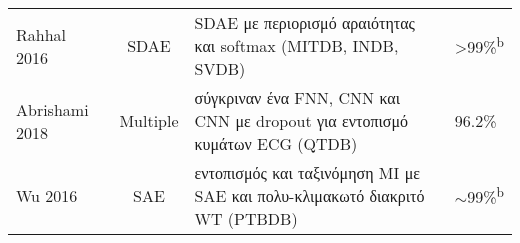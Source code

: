 \begin{sidewaystable}
\begin{tabular}{l c l l}
		Rahhal 2016~\cite{al2016deep}          & SDAE            & SDAE με περιορισμό αραιότητας και softmax (MITDB, INDB, SVDB)                                 & \textgreater{99\%}\textsuperscript{b}                                                                                                                                                                                                                                                                                                                                                                                                                                                                                                                                                                                                                                                                                                                                                                                                                                       \\
		Abrishami 2018~\cite{abrishami2018p}   & Multiple        & σύγκριναν ένα FNN, CNN και CNN με dropout για εντοπισμό κυμάτων ECG (QTDB)                & 96.2\%                                                                                                                                                                                                                                                                                                                                                                                                                                                                                                                                                                                                                                                                                                                                                                                                                                                                           \\
		Wu 2016~\cite{wu2016myocardial}        & SAE             & εντοπισμός και ταξινόμηση MI με SAE και πολυ-κλιμακωτό διακριτό WT (PTBDB)                       & $\sim$99\%\textsuperscript{b}                                                                                                                                                                                                                                                                                                                                                                                                                                                                                                                                                                                                                                                                                                                                                                                                                                               \\

\end{tabular}
\end{sidewaystable}
